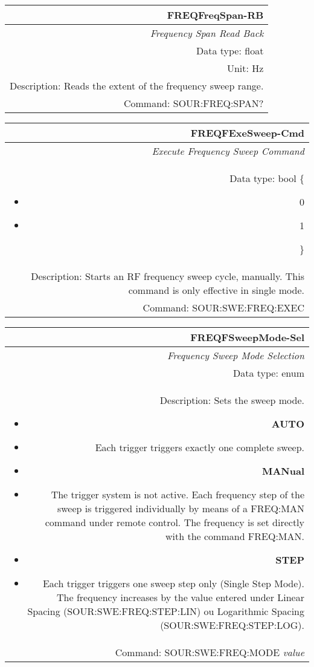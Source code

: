 \documentclass[openany]{article}
\begin{document}
		\begin{tabular}{N}
			\hline
			\bfseries FREQFreqSpan-RB \\ \hline
			\emph{Frequency Span Read Back} \\
			Data type: float \\
			Unit: Hz \\
			Description: Reads the extent of the frequency sweep range. \\
			Command: SOUR:FREQ:SPAN? \\

		\end{tabular}
%
		\begin{tabular}{N}
			\hline
			\bfseries FREQFExeSweep-Cmd \\ \hline
			\emph{Execute Frequency Sweep Command} \\
			Data type: bool \{\begin{itemize}[noitemsep]
				\small
				\item[] 0
				\item[] 1
			\end{itemize}\} \\
			Description: Starts an RF frequency sweep cycle, manually. This command is only effective in single mode. \\
			Command: SOUR:SWE:FREQ:EXEC \\

		\end{tabular}
%
		\begin{tabular}{N}
			\hline
			\bfseries FREQFSweepMode-Sel \\ \hline
			\emph{Frequency Sweep Mode Selection} \\
			Data type: enum \\
			Description: Sets the sweep mode.\begin{itemize}[noitemsep]
				\small
				\item[] \textbf{AUTO}
				\item[] Each trigger triggers exactly one complete sweep.
				\item[] \textbf{MANual}
				\item[] The trigger system is not active. Each frequency step of the sweep is triggered individually by means of a FREQ:MAN command under remote control. The frequency is set directly with the command FREQ:MAN.
				\item[] \textbf{STEP}
				\item[] Each trigger triggers one sweep step only (Single Step Mode). The frequency increases by the value entered under Linear Spacing (SOUR:SWE:FREQ:STEP:LIN) ou Logarithmic Spacing (SOUR:SWE:FREQ:STEP:LOG).
			\end{itemize} \\
			Command: SOUR:SWE:FREQ:MODE \emph{value} \\

		\end{tabular}
\end{document}
